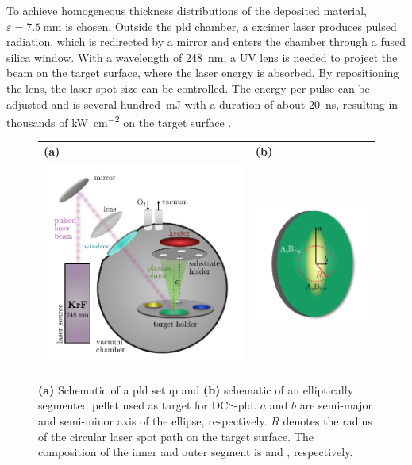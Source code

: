 To achieve homogeneous thickness distributions of the deposited material, $\varepsilon=\qty{7.5}{\mm}$ is chosen.
Outside the \gls{pld} chamber, a  excimer laser produces pulsed radiation, which is redirected by a mirror and enters the chamber through a fused silica window.
With a wavelength of \qty{248}{\nm}, a UV lens is needed to project the beam on the target surface, where the laser energy is absorbed.
By repositioning the lens, the laser spot size can be controlled.
The energy per pulse can be adjusted and is several hundred~\unit{\mJ} with a duration of about \qty{20}{\ns}, resulting in thousands of \unit{\kW\per\square\cm} on the target surface
    \cite{lorenz2019}.
\begin{figure}
    \centering
    \begin{tabular}{ll}
        \textbf{(a)}&\textbf{(b)}\\
        \includegraphics[width=9cm,align=c]{fastImages/PLD.pdf}&
        \includegraphics[width=5cm,align=c]{fastImages/target.pdf}  
    \end{tabular}
    \caption{\textbf{(a)} Schematic of a \gls{pld} setup and \textbf{(b)} schematic of an elliptically segmented pellet used as target for \acrshort{DCS}-\gls{pld}.
    $a$ and $b$ are semi-major and semi-minor axis of the ellipse, respectively.
    $R$ denotes the radius of the circular laser spot path on the target surface.
    The composition of the inner and outer segment is  and , respectively.}
    \label{Fig:Methods_pld}
\end{figure}

